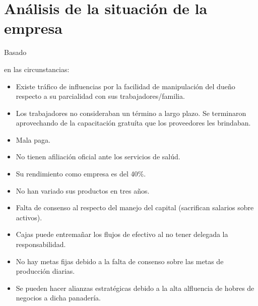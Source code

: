 \documentclass[stu, 12pt, letterpaper, donotrepeattitle, floatsintext, natbib]{apa7}
\begin{document}
\section{Análisis de la situación de la empresa}
Basado \begin{justifying}
    en las circunstancias:
    \begin{itemize}
        \item Existe tráfico de influencias por la facilidad de manipulación del dueño respecto a su parcialidad con sus trabajadores/familia.
        \item Los trabajadores no consideraban un término a largo plazo. Se terminaron aprovechando de la capacitación gratuíta que los proveedores les brindaban.
        \item Mala paga.
        \item No tienen afiliación oficial ante los servicios de salúd.
        \item Su rendimiento como empresa es del 40\%.
        \item No han variado sus productos en tres años.
        \item Falta de consenso al respecto del manejo del capital (sacrifican salarios sobre activos).
        \item Cajas puede entremañar los flujos de efectivo al no tener delegada la responsabilidad.
        \item No hay metas fijas debido a la falta de consenso sobre las metas de producción diarias.
        \item Se pueden hacer alianzas estratégicas debido a la alta alfluencia de hobres de negocios a dicha panadería.
    \end{itemize}\par
\end{justifying}
\vspace{\baselineskip}
\end{document}
